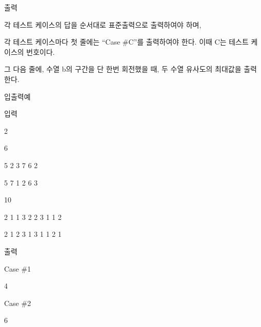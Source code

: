 \documentclass [12pt] {oblivoir}
\begin{document}
출력

각 테스트 케이스의 답을 순서대로 표준출력으로 출력하여야 하며,

각 테스트 케이스마다 첫 줄에는 “Case \#C”를 출력하여야 한다. 이때 C는 테스트 케이스의 번호이다.

그 다음 줄에, 수열 b의 구간을 단 한번 회전했을 때, 두 수열 유사도의 최대값을 출력한다.

\vspace{5mm}

입출력예

입력

2

6

5 2 3 7 6 2

5 7 1 2 6 3

10

2 1 1 3 2 2 3 1 1 2

2 1 2 3 1 3 1 1 2 1

\vspace{3mm}

출력

Case \#1

4

Case \#2

6
\end{document}
